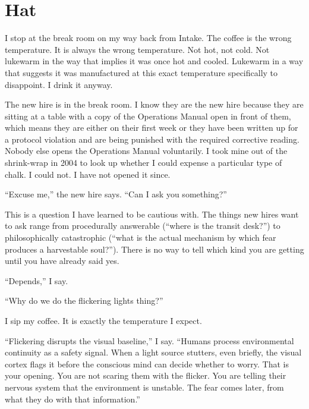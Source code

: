 
\chapter{Hat}

I stop at the break room on my way back from Intake. The coffee is the wrong temperature. It is always the wrong temperature. Not hot, not cold. Not lukewarm in the way that implies it was once hot and cooled. Lukewarm in a way that suggests it was manufactured at this exact temperature specifically to disappoint. I drink it anyway.

The new hire is in the break room. I know they are the new hire because they are sitting at a table with a copy of the Operations Manual open in front of them, which means they are either on their first week or they have been written up for a protocol violation and are being punished with the required corrective reading. Nobody else opens the Operations Manual voluntarily. I took mine out of the shrink-wrap in 2004 to look up whether I could expense a particular type of chalk. I could not. I have not opened it since.

``Excuse me,'' the new hire says. ``Can I ask you something?''

This is a question I have learned to be cautious with. The things new hires want to ask range from procedurally answerable (``where is the transit desk?'') to philosophically catastrophic (``what is the actual mechanism by which fear produces a harvestable soul?''). There is no way to tell which kind you are getting until you have already said yes.

``Depends,'' I say.

``Why do we do the flickering lights thing?''

I sip my coffee. It is exactly the temperature I expect.

``Flickering disrupts the visual baseline,'' I say. ``Humans process environmental continuity as a safety signal. When a light source stutters, even briefly, the visual cortex flags it before the conscious mind can decide whether to worry. That is your opening. You are not scaring them with the flicker. You are telling their nervous system that the environment is unstable. The fear comes later, from what they do with that information.''

